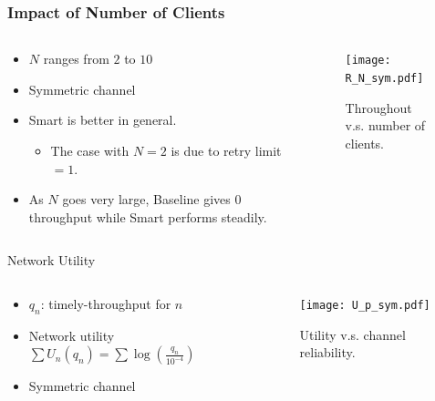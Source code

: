 \documentclass{beamer}
\begin{document}
\begin{frame}
\frametitle{Impact of Number of Clients}
\begin{columns}
  \begin{column}{.5\textwidth}
\begin{itemize}
\item $N$ ranges from $2$ to $10$
\item Symmetric channel
\item Smart is better in general.
  \begin{itemize}
    \item The case with $N=2$ is due to retry limit $=1$.
  \end{itemize}
\item As $N$ goes very large, Baseline gives $0$ throughput while Smart
  performs steadily.
\end{itemize}
  \end{column}
  \begin{column}{.5\textwidth}
\begin{figure}[htbp]
  \centering
  \texttt{[image: R\_N\_sym.pdf]}
  \caption{Throughout v.s. number of clients.}
\end{figure}
  \end{column}
\end{columns}
\end{frame}

\begin{frame}{Network Utility}
\begin{columns}
  \begin{column}{.5\textwidth}
  \begin{itemize}
    \item $q_n$: timely-throughput for $n$
    \item Network utility $\sum U_n(q_n) = \sum \log (\frac{q_n}{10^{-4}})$
    \item Symmetric channel
  \end{itemize}
  \end{column}
  \begin{column}{.5\textwidth}
\begin{figure}[htbp]
  \centering
  \texttt{[image: U\_p\_sym.pdf]}
  \caption{Utility v.s. channel reliability.}
\end{figure}
  \end{column}
\end{columns}
\end{frame}
\end{document}

